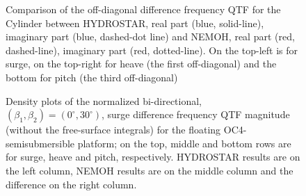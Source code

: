 \documentclass[12pt,a4paper,titlepage]{article}
\begin{document}
\begin{figure}[ht!]
{}
	\caption{Comparison of the off-diagonal difference frequency QTF for the Cylinder between HYDROSTAR, real part (blue, solid-line), imaginary part (blue, dashed-dot line) and NEMOH, real part (red, dashed-line), imaginary part (red, dotted-line). On the top-left is for surge, on the top-right for heave (the first off-diagonal) and the bottom for pitch (the third off-diagonal)}\label{fig:QTFM_diag_Cylinder}
\end{figure}

\begin{figure}[ht!]
	\centering
{}
	\caption{Density plots of the normalized bi-directional, $(\beta_1,\beta_2)=(0^{\circ},30^{\circ})$, surge difference frequency QTF magnitude (without the free-surface integrals) for the floating OC4-semisubmersible platform; on the top, middle and bottom rows are for surge, heave and pitch, respectively. HYDROSTAR results are on the left column, NEMOH results are on the middle column and the difference on the right column.}\label{fig:QTFM_OC4}
\end{figure}
\end{document}
